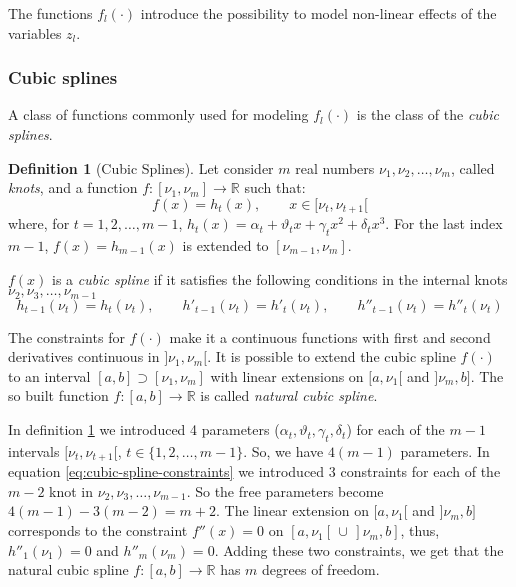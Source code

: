 \documentclass[a4paper, nobind]{templates/ociamthesis}
\theoremstyle{definition}
\newtheorem{definition}{Definition}[chapter]
\theoremstyle{definition}
\theoremstyle{definition}
\theoremstyle{remark}
\begin{document}
The functions \(f_l(\cdot)\) introduce the possibility to model non-linear effects of the variables \(z_l\).

\hypertarget{chap:cubic-splines}{%
\subsubsection{Cubic splines}\label{chap:cubic-splines}}

A class of functions commonly used for modeling \(f_l(\cdot)\) is the class of the \emph{cubic splines}.

\begin{definition}[Cubic Splines]
\label{def:cubic-splines} \iffalse (Cubic Splines) \fi{} Let consider \(m\) real numbers \(\nu_1, \nu_2, \dots, \nu_m\), called \textit{knots}, and a function \(f:[\nu_1, \nu_m] \to \mathbb{R}\) such that:
\[
f(x) = h_t(x), \qquad x\in[\nu_t, \nu_{t+1}[
\]
where, for \(t = 1, 2, \dots, m-1\), \(h_t(x) = \alpha_t + \vartheta_t x + \gamma_t x^2 + \delta_t x^3\). For the last index \(m-1\), \(f(x) = h_{m-1}(x)\) is extended to \([\nu_{m-1}, \nu_{m}]\).

\(f(x)\) is a \textit{cubic spline} if it satisfies the following conditions in the internal knots \(\nu_2, \nu_3, \dots, \nu_{m-1}\)
\begin{equation}
\label{eq:cubic-spline-constraints}
h_{t-1}(\nu_t) = h_{t}(\nu_t), \qquad h'_{t-1}(\nu_t) = h'_{t}(\nu_t), \qquad h''_{t-1}(\nu_t) = h''_{t}(\nu_t)
\end{equation}
\end{definition}

The constraints for \(f(\cdot)\) make it a continuous functions with first and second derivatives continuous in \(]\nu_1, \nu_m[\). It is possible to extend the cubic spline \(f(\cdot)\) to an interval \([a, b] \supset [\nu_1, \nu_m]\) with linear extensions on \([a, \nu_1[\) and \(]\nu_m, b]\). The so built function \(f:[a,b]\to\mathbb{R}\) is called \emph{natural cubic spline}.

In definition \ref{def:cubic-splines} we introduced 4 parameters (\(\alpha_t, \vartheta_t, \gamma_t, \delta_t\)) for each of the \(m-1\) intervals \([\nu_t, \nu_{t+1}[\), \(t\in\{1,2,\dots,m-1\}\). So, we have \(4(m-1)\) parameters. In equation \eqref{eq:cubic-spline-constraints} we introduced \(3\) constraints for each of the \(m-2\) knot in \(\nu_2, \nu_3, \dots, \nu_{m-1}\). So the free parameters become \(4(m-1) - 3(m-2) = m+2\). The linear extension on \([a, \nu_1[\) and \(]\nu_m, b]\) corresponds to the constraint \(f''(x)=0\) on \([a, \nu_1[ \, \cup \, ]\nu_m, b]\), thus, \(h''_1(\nu_1)=0\) and \(h''_m(\nu_m)=0\). Adding these two constraints, we get that the natural cubic spline \(f:[a,b]\to\mathbb{R}\) has \(m\) degrees of freedom.
\end{document}
